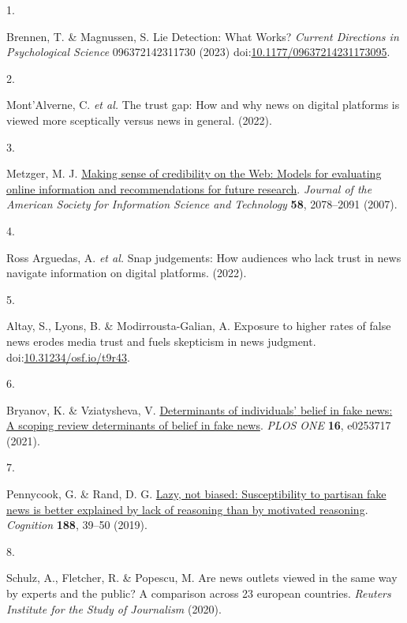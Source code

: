 \documentclass[
  doc,floatsintext]{apa6}
\newlength{\cslhangindent}
\newlength{\csllabelwidth}
\newenvironment{CSLReferences}[2] %
 {\begin{list}{}{%
  \setlength{\itemindent}{0pt}
  \setlength{\leftmargin}{0pt}
  \setlength{\parsep}{0pt}
  \ifodd #1
   \setlength{\leftmargin}{\cslhangindent}
   \setlength{\itemindent}{-1\cslhangindent}
  \fi
  \setlength{\itemsep}{#2\baselineskip}}}
 {\end{list}}
\newcommand{\CSLLeftMargin}[1]{\parbox[t]{\csllabelwidth}{\strut#1\strut}}
\newcommand{\CSLRightInline}[1]{\parbox[t]{\linewidth - \csllabelwidth}{\strut#1\strut}}
\begin{document}
\label{refs}
\begin{CSLReferences}{0}{0}
\CSLLeftMargin{1. }%
\CSLRightInline{Brennen, T. \& Magnussen, S. Lie Detection: What Works? \emph{Current Directions in Psychological Science} 096372142311730 (2023) doi:\href{https://doi.org/10.1177/09637214231173095}{10.1177/09637214231173095}.}

\CSLLeftMargin{2. }%
\CSLRightInline{Mont'Alverne, C. \emph{et al.} The trust gap: How and why news on digital platforms is viewed more sceptically versus news in general. (2022).}

\CSLLeftMargin{3. }%
\CSLRightInline{Metzger, M. J. \href{https://doi.org/10.1002/asi.20672}{Making sense of credibility on the Web: Models for evaluating online information and recommendations for future research}. \emph{Journal of the American Society for Information Science and Technology} \textbf{58}, 2078--2091 (2007).}

\CSLLeftMargin{4. }%
\CSLRightInline{Ross Arguedas, A. \emph{et al.} Snap judgements: How audiences who lack trust in news navigate information on digital platforms. (2022).}

\CSLLeftMargin{5. }%
\CSLRightInline{Altay, S., Lyons, B. \& Modirrousta-Galian, A. Exposure to higher rates of false news erodes media trust and fuels skepticism in news judgment. doi:\href{https://doi.org/10.31234/osf.io/t9r43}{10.31234/osf.io/t9r43}.}

\CSLLeftMargin{6. }%
\CSLRightInline{Bryanov, K. \& Vziatysheva, V. \href{https://doi.org/10.1371/journal.pone.0253717}{Determinants of individuals{'} belief in fake news: A scoping review determinants of belief in fake news}. \emph{PLOS ONE} \textbf{16}, e0253717 (2021).}

\CSLLeftMargin{7. }%
\CSLRightInline{Pennycook, G. \& Rand, D. G. \href{https://doi.org/10.1016/j.cognition.2018.06.011}{Lazy, not biased: Susceptibility to partisan fake news is better explained by lack of reasoning than by motivated reasoning}. \emph{Cognition} \textbf{188}, 39--50 (2019).}

\CSLLeftMargin{8. }%
\CSLRightInline{Schulz, A., Fletcher, R. \& Popescu, M. Are news outlets viewed in the same way by experts and the public? A comparison across 23 european countries. \emph{Reuters Institute for the Study of Journalism} (2020).}


\end{CSLReferences}
\end{document}
